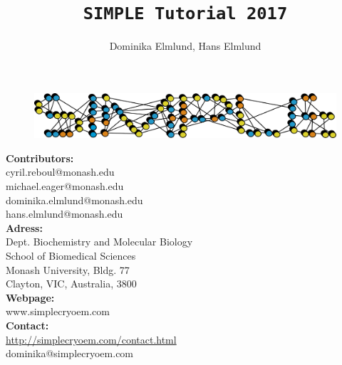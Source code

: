 \documentclass[a4paper,11pt]{article}
\newcommand{\prgname}[1]{\textcolor{NavyBlue}{\texttt{#1}}}
\begin{document}
\begin{figure}
\centering
\includegraphics[keepaspectratio=true,scale=0.6]{./SIMPLE_logo/rawlogo}
\end{figure}

\title{\prgname{SIMPLE Tutorial 2017}}
\author{Dominika Elmlund, Hans Elmlund}
\maketitle

\vspace{1em}
\begin{minipage}[ht]{0.48\textwidth}
\textbf{Contributors:}\\
cyril.reboul@monash.edu\\
michael.eager@monash.edu\\
dominika.elmlund@monash.edu\\
hans.elmlund@monash.edu\\
\textbf{Adress:}\\
Dept. Biochemistry and Molecular Biology\\
School of Biomedical Sciences\\
Monash University, Bldg. 77\\
Clayton, VIC, Australia, 3800\\
\textbf{Webpage:}\\
www.simplecryoem.com\\
\textbf{Contact:}\\
\url{http://simplecryoem.com/contact.html}\\
dominika@simplecryoem.com\\
\end{minipage}
\vspace{20pt}
\end{document}

